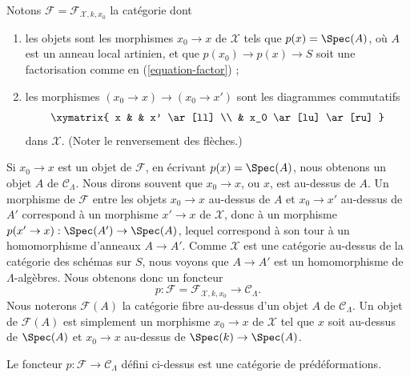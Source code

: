 \medskip\noindent
Notons $\mathcal{F} = \mathcal{F}_{\mathcal{X}, k, x_0}$ la
catégorie dont
\begin{enumerate}
\item les objets sont les morphismes $x_0 \to x$ de $\mathcal{X}$ tels que
$p(x) = \Spec(A)$, où $A$ est un anneau local artinien, et que
$p(x_0) \to p(x) \to S$ soit une factorisation comme en (\ref{equation-factor}) ;
\item les morphismes $(x_0 \to x) \to (x_0 \to x')$ sont les diagrammes
commutatifs
$$
\xymatrix{
x & & x' \ar[ll] \\
& x_0 \ar[lu] \ar[ru]
}
$$
dans $\mathcal{X}$. (Noter le renversement des flèches.)
\end{enumerate}
Si $x_0 \to x$ est un objet de $\mathcal{F}$, en écrivant $p(x) = \Spec(A)$,
nous obtenons un objet $A$ de $\mathcal{C}_\Lambda$. Nous dirons souvent que
$x_0 \to x$, ou $x$, est au-dessus de $A$. Un morphisme de $\mathcal{F}$ entre les objets
$x_0 \to x$ au-dessus de $A$ et $x_0 \to x'$ au-dessus de $A'$
correspond à un morphisme $x' \to x$ de $\mathcal{X}$, donc à un morphisme
$p(x' \to x) : \Spec(A') \to \Spec(A)$, lequel correspond à son tour à un
homomorphisme d'anneaux $A \to A'$. Comme $\mathcal{X}$ est une catégorie
au-dessus de la catégorie des schémas sur $S$, nous voyons que $A \to A'$ est un
homomorphisme de $\Lambda$-algèbres. Nous obtenons donc un foncteur
\begin{equation}
\label{equation-predeformation-category}
p : \mathcal{F} = \mathcal{F}_{\mathcal{X}, k, x_0}
\longrightarrow
\mathcal{C}_\Lambda.
\end{equation}
Nous noterons $\mathcal{F}(A)$ la catégorie fibre
au-dessus d'un objet $A$ de $\mathcal{C}_\Lambda$. Un objet de $\mathcal{F}(A)$
est simplement un morphisme $x_0 \to x$ de $\mathcal{X}$ tel que
$x$ soit au-dessus de $\Spec(A)$ et $x_0 \to x$ au-dessus de $\Spec(k) \to \Spec(A)$.

\begin{lemma}
\label{lemma-predeformation-category}
Le foncteur $p : \mathcal{F} \to \mathcal{C}_\Lambda$ défini ci-dessus
est une catégorie de prédéformations.
\end{lemma}

